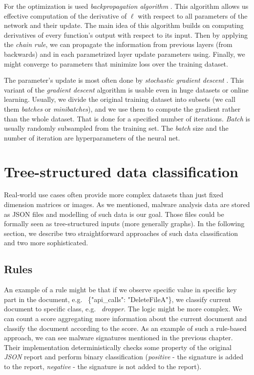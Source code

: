For the optimization is used \emph{backpropagation algorithm} \cite{Rumelhart1988}. This algorithm allows us effective computation of the derivative of $\ell$ with respect to all parameters of the network and their update. The main idea of this algorithm builds on computing derivatives of every function's output with respect to its input. Then by applying the \emph{chain rule}, we can propagate the information from previous layers (from backwards) and in each parametrized layer update parameters using. Finally, we might converge to parameters that minimize loss over the training dataset. 

The parameter's update is most often done by \emph{stochastic gradient descent} \cite{Kiefer1952}. This variant of the \emph{gradient descent} algorithm is usable even in huge datasets or online learning. Usually, we divide the original training dataset into subsets (we call them \emph{batches} or \emph{minibatches}), and we use them to compute the gradient rather than the whole dataset. That is done for a specified number of iterations. \emph{Batch} is usually randomly subsampled from the training set. The \emph{batch} size and the number of iteration are hyperparameters of the neural net.

\section{Tree-structured data classification}
Real-world use cases often provide more complex datasets than just fixed dimension matrices or images. As we mentioned, malware analysis data are stored as JSON files and modelling of such data is our goal. Those files could be formally seen as tree-structured inputs (more generally graphs). In the following section, we describe two straightforward approaches of such data classification and two more sophisticated.

\subsection{Rules}
An example of a rule might be that if we observe specific value in specific key part in the document, e.g. \ \{"api_calls": "DeleteFileA"\}, we classify current document to specific class, e.g. \ \emph{dropper}. The logic might be more complex. We can count a score aggregating more information about the current document and classify the document according to the score. As an example of such a rule-based approach, we can see malware signatures mentioned in the previous chapter. Their implementation deterministically checks some property of the original \emph{JSON} report and perform binary classification (\emph{positive} - the signature is added to the report, \emph{negative} - the signature is not added to the report).

